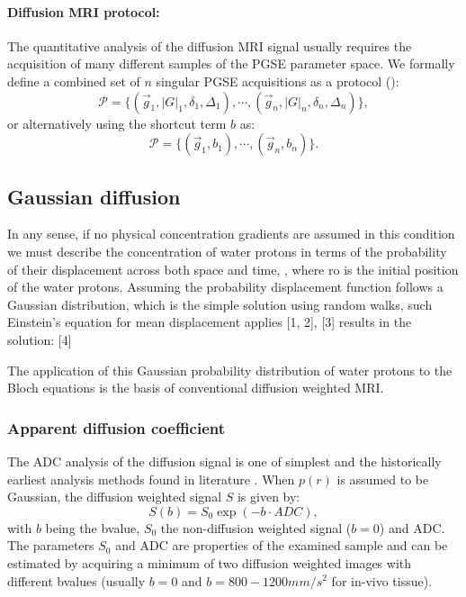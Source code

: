\paragraph{Diffusion MRI protocol: } The quantitative analysis of the diffusion MRI signal usually requires the acquisition of many different samples of the PGSE parameter space. We formally define a combined set of $n$ singular PGSE acquisitions as a protocol (\prot):
\begin{equation}
	\mathcal{P} = \{(\vec{g}_1,|G|_1,\delta_1,\Delta_1),\cdots,(\vec{g}_n,|G|_n,\delta_n,\Delta_n)\},
\end{equation}
or alternatively using the shortcut term $b$ as:
\begin{equation*}		
	\mathcal{P} = \{(\vec{g}_1,b_1),\cdots,(\vec{g}_n,b_n)\}.
\end{equation*} 



\subsection*{Gaussian diffusion}
In any sense, if no physical concentration gradients are assumed in this condition we must describe the concentration of water protons in terms of the probability of their displacement across both space and time,  , where ro is the initial position of the water protons. Assuming the probability displacement function follows a Gaussian distribution, which is the simple solution using random walks, such Einstein’s equation for mean displacement applies [1, 2],  
 									[3]
results in the solution:
 							[4]

The application of this Gaussian probability distribution of water protons to the Bloch equations is the basis of conventional diffusion weighted MRI. 


\label{sec:gaussian_diffusion}
\subsubsection*{Apparent diffusion coefficient}
\label{subsec:adc}
The \gls{ADC} analysis of the diffusion signal is one of simplest and the historically earliest analysis methods found in literature \citep{ADC citations}.  When $p(r)$ is assumed to be Gaussian, the diffusion weighted signal $S$ is given by:
\begin{equation}
	S(b) = S_{0}\exp(-b\cdot ADC),
    \label{eq:chapter 2 adc}
\end{equation}
with $b$ being the {\gls{bvalue}}, $S_{0}$ the non-diffusion weighted signal ($b=0$) and \gls{ADC}. The parameters $S_0$ and \gls{ADC} are properties of the examined sample and can be estimated by acquiring a minimum of two diffusion weighted images with different {\glspl{bvalue}} (usually $b=0$ and $b=800-1200mm/s^2$ for in-vivo tissue). 
